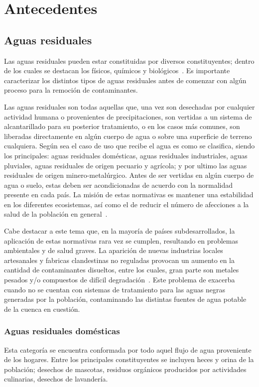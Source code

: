 \section{Antecedentes}
\subsection{Aguas residuales}
Las aguas residuales pueden estar constituidas por diversos constituyentes; dentro de los cuales se destacan los físicos, químicos y biológicos~\citep{crites2000}. Es importante caracterizar los distintos tipos de aguas residuales antes de comenzar con algún proceso para la remoción de contaminantes.\par
Las aguas residuales son todas aquellas que, una vez son desechadas por cualquier actividad humana o provenientes de precipitaciones, son vertidas a un sistema de alcantarillado para su posterior tratamiento, o en los casos más comunes, son liberadas directamente en algún cuerpo de agua o sobre una superficie de terreno cualquiera. Según sea el caso de uso que recibe el agua es como se clasifica, siendo los principales: aguas residuales domésticas, aguas residuales industriales, aguas pluviales, aguas residuales de origen pecuario y agrícola; y por ultimo las aguas residuales de origen minero-metalúrgico.
Antes de ser vertidas en algún cuerpo de agua o suelo, estas deben ser acondicionadas de acuerdo con la normalidad presente en cada país. La misión de estas normativas es mantener una estabilidad en los diferentes ecosistemas, así como el de reducir el número de afecciones a la salud de la población en general~\citep{lazcano2016,martinez1999}.\par
Cabe destacar a este tema que, en la mayoría de países subdesarrollados, la aplicación de estas normativas rara vez se cumplen, resultando en problemas ambientales y de salud graves. La aparición de nuevas industrias locales artesanales y fabricas clandestinas no reguladas provocan un aumento en la cantidad de contaminantes disueltos, entre los cuales, gran parte son metales pesados y/o compuestos de difícil degradación~\cite{metcalf2003}.
Este problema de exacerba cuando no se cuentan con sistemas de tratamiento para las aguas negras generadas por la población, contaminando las distintas fuentes de agua potable de la cuenca en cuestión.\par
\subsubsection*{Aguas residuales domésticas}
Esta categoría se encuentra conformada por todo aquel flujo de agua proveniente de los hogares. Entre los principales constituyentes se incluyen heces y orina de la población; desechos de mascotas, residuos orgánicos producidos por actividades culinarias, desechos de lavandería.
